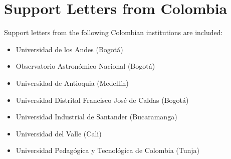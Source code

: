 \documentclass[12pt]{article}
\begin{document}
\section{Support Letters from Colombia}
Support letters from the following Colombian institutions are included:
\begin{itemize}
\item Universidad de los Andes (Bogot\'a)
\item Observatorio Astron\'omico Nacional (Bogot\'a)
\item Universidad de Antioquia (Medell\'in)
\item Universidad Distrital Francisco Jos\'e de Caldas (Bogot\'a)
\item Universidad Industrial de Santander (Bucaramanga)
\item Universidad del Valle (Cali)
\item Universidad Pedag\'ogica y Tecnol\'ogica de Colombia (Tunja)
\end{itemize}
\end{document}
